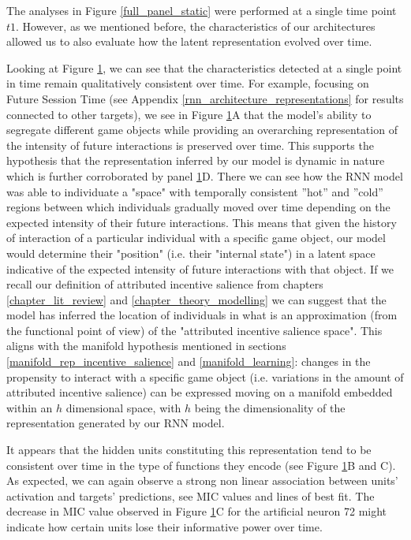 \begin{figure}[!htb]
\label{full_panel_temporal}
\end{figure}

The analyses in Figure \ref{full_panel_static} were performed at a single time point $t1$. However, as we mentioned before, the characteristics of our architectures allowed us to also evaluate how the latent representation evolved over time. 

Looking at Figure \ref{full_panel_temporal}, we can see that the characteristics detected at a single point in time remain qualitatively consistent over time. For example, focusing on Future Session Time (see Appendix \ref{rnn_architecture_representations} for results connected to other targets), we see in Figure \ref{full_panel_temporal}A that the model's ability to segregate different game objects while providing an  overarching representation of the intensity of future interactions is preserved over time. This supports the hypothesis that the representation inferred by our model is dynamic in nature which is further corroborated by panel \ref{full_panel_temporal}D. There we can see how the RNN model was able to individuate a "space" with temporally consistent ”hot” and ”cold” regions between which individuals gradually moved over time depending on the expected intensity of their future interactions. This means that given the history of interaction of a particular individual with a specific game object, our model would determine their "position" (i.e. their "internal state") in a latent space indicative of the expected intensity of future interactions with that object. If we recall our definition of attributed incentive salience from chapters \ref{chapter_lit_review} and \ref{chapter_theory_modelling} we can suggest that the model has inferred the location of individuals in what is an approximation (from the functional point of view) of the "attributed incentive salience space". This aligns with the manifold hypothesis mentioned in sections \ref{manifold_rep_incentive_salience} and \ref{manifold_learning}: changes in the propensity to interact with a specific game object (i.e. variations in the amount of attributed incentive salience) can be expressed moving on a manifold embedded within an $h$ dimensional space, with $h$ being the dimensionality of the representation generated by our RNN model. 

It appears that the hidden units constituting this representation tend to be consistent over time in the type of functions they encode (see Figure \ref{full_panel_temporal}B and C). As expected, we can again observe a strong non linear association between units' activation and targets' predictions, see MIC values and lines of best fit. The decrease in MIC value observed in Figure \ref{full_panel_temporal}C for the artificial neuron 72 might indicate how certain units lose their informative power over time.

